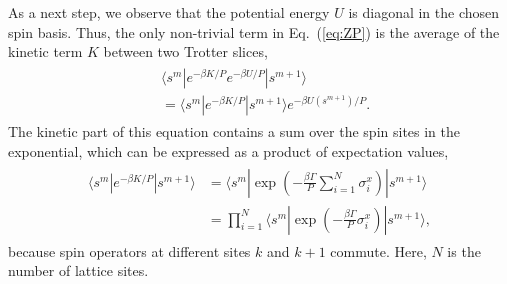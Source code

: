 \documentclass[aps,prd,twocolumn, superscriptaddress,preprintnumbers, nofootinbib,longbibliography,floatfix]{revtex4-2}
\DeclareRobustCommand{\Eq}[1]{Eq.~(\ref{#1})}
\begin{document}
As a next step, we observe that the potential energy $U$ is diagonal in the chosen spin basis. Thus, the only non-trivial term in \Eq{eq:ZP} is the average of the kinetic term $K$ between two Trotter slices,
%
\begin{align}
\begin{split}
&\langle s^m| e^{-\beta K/P}e^{-\beta U/P} | s^{m+1}\rangle\\
&= \langle s^m| e^{-\beta K/P} | s^{m+1}\rangle e^{-\beta U(s^{m+1})/P}.
\end{split}
\label{eq:nontrivial}
\end{align}
%
The kinetic part of this equation contains a sum over the spin sites in the exponential, which can be expressed as a product of expectation values,
%
\begin{align}
\begin{split}
\langle s^m| e^{-\beta K/P} | s^{m+1}\rangle  &= \langle s^m| \exp\left(-\frac{\beta \Gamma}{P} \sum_{i=1}^N\sigma_i^x\right) | s^{m+1}\rangle\\
&=\prod_{i=1}^N \langle s^m| \exp\left(-\frac{\beta \Gamma}{P} \sigma_i^x\right) | s^{m+1}\rangle,
\end{split}
\label{eq:spinprod}
\end{align}
%
because spin operators at different sites $k$ and $k+1$ commute. Here, $N$ is the number of lattice sites.
\end{document}
